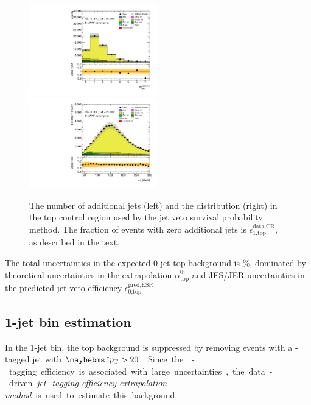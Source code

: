 \begin{figure}[t]
	\includegraphics[width=0.495\textwidth]{tex/backgrounds/emme_CutTopControl_AddTrackMET_nJets_probing_mh125_lin}
	\hfill
	\includegraphics[width=0.495\textwidth]{tex/backgrounds/emme_CutTopControl_AddTrackMET_MT_TrackHWW_Clj_mh125_lin}
	\caption{The number of additional jets (left) and the \mt distribution (right) in the 
	top control region used by the jet veto survival probability method. The fraction of 
	events with zero additional jets is $\epsilon_{\text{1,top}}^{\text{data,CR}}$, as 
	described in the text.}
	\label{fig:top:jvsp}
\end{figure}

The total uncertainties in the expected 0-jet top background is \%, dominated by 
theoretical uncertainties in the extrapolation $\alpha_{\text{top}}^{\text{0j}}$ and 
JES/JER uncertainties in the predicted jet veto efficiency 
$\epsilon_{\text{0,top}}^{\text{pred,ESR}}$.



\subsection{1-jet bin estimation}
\label{sec:top:1j}

In the 1-jet bin, the top background is suppressed by removing events with a 
\Pbottom-tagged jet with \unit{$\pt > 20$}{\GeV}. Since the \Pbottom-tagging efficiency is 
associated with large uncertainties, the data-driven \textit{jet \Pbottom-tagging 
efficiency extrapolation method} is used to estimate this background.

